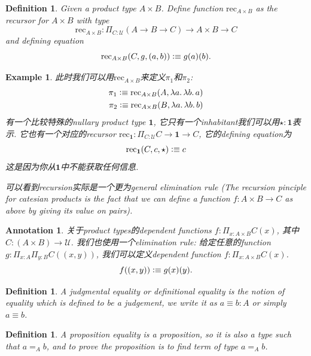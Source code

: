 \documentclass{article}
\newtheorem{example}[theorem]{Example}
\newtheorem{definition}[theorem]{Definition}
\newtheorem{annotation}[theorem]{Annotation}
\newcommand{\lam}[2]{\ensuremath{\lambda #1\ldotp #2}} %
\newcommand{\defeqv}{\vcentcolon\equiv}
\begin{document}
\begin{definition}
\rm Given a product type $A \times B$. Define function $\text{rec}_{A \times B}$ as the recursor for $A \times B$ with type
\[
	\text{rec}_{A \times B}:\Pi_{C:\mathcal{U}}(A \to B \to C) \to A \times B \to C
\]
and defining equation
\[
	\text{rec}_{A \times B}(C, g, (a,b)) \defeqv g(a)(b).
\]
\end{definition}

\begin{example}
\rm 此时我们可以用$\text{rec}_{A \times B}$来定义$\pi_1$和$\pi_2$:
\[
	\begin{aligned}
	\pi_1 \defeqv \text{rec}_{A \times B}(A, \lam{a}{\lam{b}{a}}) \\
	\pi_2 \defeqv \text{rec}_{A \times B}(B, \lam{a}{\lam{b}{b}})
	\end{aligned}
\]
有一个比较特殊的nullary product type $\mathbf{1}$, 它只有一个inhabitant我们可以用$\star:\mathbf{1}$表示. 它也有一个对应的recursor $\text{rec}_\mathbf{1}: \Pi_{C:\mathcal{U}} C \to \mathbf{1} \to C$, 它的defining equation为
\[
	\text{rec}_\mathbf{1}(C, c, \star) \defeqv c 
\]
这是因为你从$\mathbf{1}$中不能获取任何信息.

可以看到recursion实际是一个更为general elimination rule (The recursion pinciple for catesian products is the fact that we can define a function $f:A \times B \to C$ as above by giving its value on pairs).
\end{example}

\begin{annotation}
\rm 关于product types的dependent functions $f: \Pi_{x:A\times B}C(x)$, 其中$C: (A \times B) \to \mathcal{U}$. 我们也使用一个elimination rule: 给定任意的function $g:\Pi_{x:A}\Pi_{y:B}C((x,y))$, 我们可以定义dependent function $f: \Pi_{x:A\times B}C(x)$.
\[
	f((x,y)) \defeqv g(x)(y).
\]
\end{annotation}

\begin{definition}
\rm A judgmental equality or definitional equality is the notion of equality which is defined to be a judgement, we write it as $a \equiv b : A$ or simply $a \equiv b$.
\end{definition}

\begin{definition}
\rm A proposition equality is a proposition, so it is also a type such that $a =_A b$, and to prove the proposition is to find term of type $a =_A b$.
\end{definition}
\end{document}
